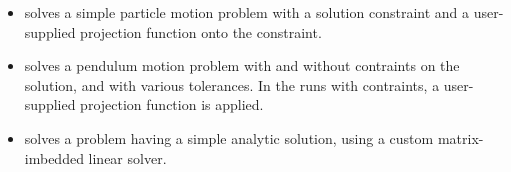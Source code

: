 \begin{itemize}
  (1) a matrix, only defined implicitly, based on a fixed number of     
  Gauss-Seidel iterations using the diffusion terms only; and               
  (2) a block-diagonal matrix based on the partial derivatives of the   
  interaction terms only, using block-grouping.                          
  \newline
  Four different runs are made for this problem.                        
  The product preconditioner is applied on the left and on the right.    
  In each case, both the modified and classical Gram-Schmidt options    
  are tested.
\item {} solves a simple particle motion problem
  with a solution constraint and a user-supplied projection function
  onto the constraint.
\item {} solves a pendulum motion problem with and
  without contraints on the solution, and with various tolerances.  In the
  runs with contraints, a user-supplied projection function is applied.
\item {} solves a problem having a simple analytic
  solution, using a custom matrix-imbedded linear solver.



\end{itemize}
